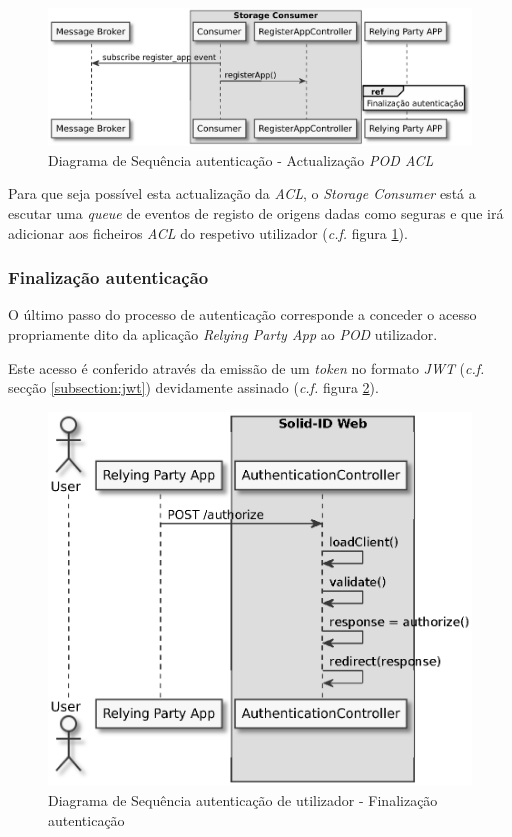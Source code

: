 \begin{figure}[H]
    \begin{center}
    \includegraphics[height=0.3 \textwidth]{figures/authentication_sd_3.eps}
    \caption{Diagrama de Sequência autenticação - Actualização \emph{\acrshort{POD} \acrshort{ACL}}}
    \label{autenticacao_sd3}
    \end{center}
\end{figure}

Para que seja possível esta actualização da \emph{\acrshort{ACL}}, o \emph{Storage Consumer} está a escutar uma \emph{queue} de eventos de registo de origens dadas como seguras e que irá adicionar aos ficheiros \emph{\acrshort{ACL}} do respetivo utilizador (\emph{c.f.} figura \ref{autenticacao_sd3}).

\subsubsection{Finalização autenticação}
O último passo do processo de autenticação corresponde a conceder o acesso propriamente dito da aplicação \emph{Relying Party App} ao \emph{\acrshort{POD}} utilizador.

Este acesso é conferido através da emissão de um \emph{token} no formato \emph{\acrshort{JWT}} (\emph{c.f.} secção \ref{subsection:jwt}) devidamente assinado (\emph{c.f.} figura \ref{autenticacao_sd4}).

\begin{figure}[H]
    \begin{center}
    \includegraphics[width=0.7 \textwidth]{figures/authentication_sd_4.eps}
    \caption{Diagrama de Sequência autenticação de utilizador - Finalização autenticação}
    \label{autenticacao_sd4}
    \end{center}
\end{figure}

